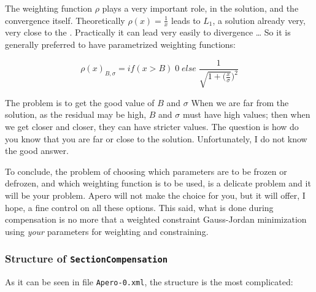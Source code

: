 The weighting function $\rho$ plays  a very important role, in the solution, and the
convergence itself.  Theoretically $\rho(x)=\frac1x$  leads to $L_1$, a solution already very,
very close to the . %
Practically it can lead very easily to divergence \dots
So it is generally preferred to have parametrized weighting functions:


\begin{equation}
   \label{EQ:L1:SEC}
   \rho(x)_{B,\sigma} = if (x>B) \; 0 \; else \;  \frac1{\sqrt{1+(\frac{x}\sigma})^2}
\end{equation}


The problem is to get the good value of $B$ and $\sigma$  When we are far from
the solution, as the residual may be high, $B$ and  $\sigma$ must have high values;
then when we get closer and closer, they can have stricter values. The question
is how do you know that you are far or close to the solution. Unfortunately,
I do not know the good answer.

To conclude, the problem of choosing which parameters are to be frozen or
defrozen, and which weighting function is to be used, is a delicate problem
and it will be your problem. Apero will not make the choice for you, but
it will offer, I hope, a fine control on all these options.
This said, what is done during compensation is no more that a weighted
constraint Gauss-Jordan minimization using \emph{your} parameters for
weighting and constraining.



\subsubsection{Structure of {\tt SectionCompensation}}

As it can be seen in  file {\tt Apero-0.xml}, the structure is
the most complicated:

